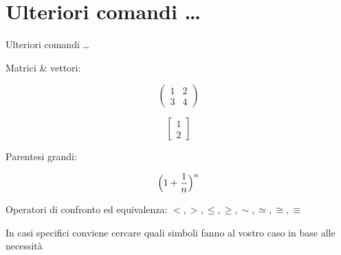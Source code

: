 \section{Ulteriori comandi \dots}
\begin{frame}{Ulteriori comandi \dots}

	Matrici \& vettori:

	\[
	\begin{pmatrix}
	1 & 2 \\
	3 & 4
	\end{pmatrix}
	\]

	\[
	\begin{bmatrix}
	1 \\
	2
	\end{bmatrix}
	\]

	Parentesi grandi:

	\[
	\Bigl(1+\frac{1}{n}\Bigr)^n
	\]

	Operatori di confronto ed equivalenza: $ <, >, \leq, \geq, \sim, \simeq, \cong, \equiv$

    In casi specifici conviene cercare quali simboli fanno al vostro caso in base alle necessità

\end{frame}
